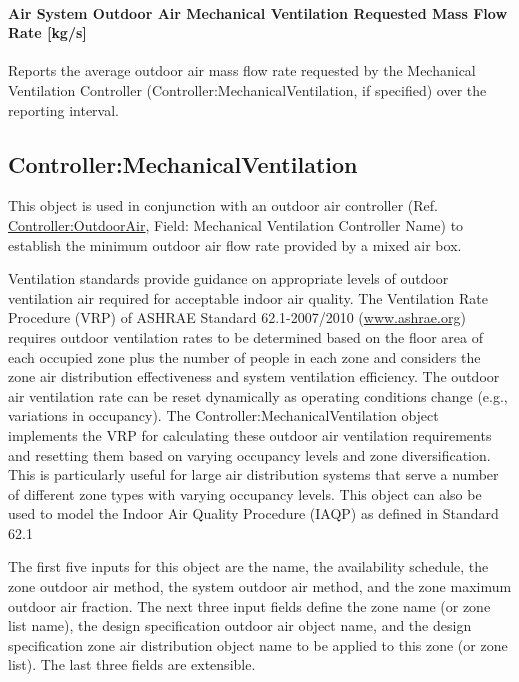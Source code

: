 \paragraph{Air System Outdoor Air Mechanical Ventilation Requested Mass Flow Rate {[}kg/s{]}}\label{air-system-mechvent-air-mass-flow-rate-kgs}

Reports the average outdoor air mass flow rate requested by the Mechanical Ventilation Controller (Controller:MechanicalVentilation, if specified) over the reporting interval.

\subsection{Controller:MechanicalVentilation}\label{controllermechanicalventilation}

This object is used in conjunction with an outdoor air controller (Ref. \hyperref[controlleroutdoorair]{Controller:OutdoorAir}, Field: Mechanical Ventilation Controller Name) to establish the minimum outdoor air flow rate provided by a mixed air box.

Ventilation standards provide guidance on appropriate levels of outdoor ventilation air required for acceptable indoor air quality. The Ventilation Rate Procedure (VRP) of ASHRAE Standard 62.1-2007/2010 (\href{http://www.ashrae.org}{www.ashrae.org}) requires outdoor ventilation rates to be determined based on the floor area of each occupied zone plus the number of people in each zone and considers the zone air distribution effectiveness and system ventilation efficiency. The outdoor air ventilation rate can be reset dynamically as operating conditions change (e.g., variations in occupancy). The Controller:MechanicalVentilation object implements the VRP for calculating these outdoor air ventilation requirements and resetting them based on varying occupancy levels and zone diversification. This is particularly useful for large air distribution systems that serve a number of different zone types with varying occupancy levels. This object can also be used to model the Indoor Air Quality Procedure (IAQP) as defined in Standard 62.1

The first five inputs for this object are the name, the availability schedule, the zone outdoor air method, the system outdoor air method, and the zone maximum outdoor air fraction. The next three input fields define the zone name (or zone list name), the design specification outdoor air object name, and the design specification zone air distribution object name to be applied to this zone (or zone list). The last three fields are extensible.

